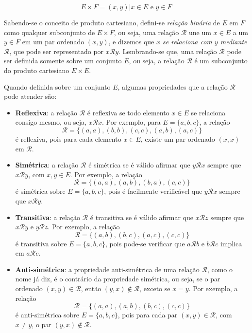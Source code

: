 \begin{equation}
  E \times F = {(x, y) | x \in E \mbox{ e } y \in F}
\end{equation}

Sabendo-se o conceito de produto cartesiano, defini-se \textit{relação binária} de \(E\) em \(F\) como qualquer subconjunto de \(E \times F\), ou seja, uma relação \(\mathcal{R}\) une um \(x \in E\) a um \(y \in F\) em um par ordenado \((x, y)\), e dizemos que \textit{\(x\) se relaciona com \(y\) mediante \(\mathcal{R}\)}, que pode ser representado por \(x\mathcal{R}y\)\cite{Domingues:2003}. Lembrando-se que, uma relação \(\mathcal{R}\) pode ser definida somente sobre um conjunto \(E\), ou seja, a relação \(\mathcal{R}\) é um subconjunto do produto cartesiano \(E \times E\).

Quando definida sobre um conjunto \(E\), algumas propriedades que a relação \(\mathcal{R}\) pode atender são:

\begin{itemize}
  \item \textbf{Reflexiva}: a relação \(\mathcal{R}\) é reflexiva se todo elemento \(x \in E\) se relaciona consigo mesmo, ou seja, \(x\mathcal{R}x\). Por exemplo, para \(E = \{a, b, c\}\), a relação 
  $$\mathcal{R} = \{(a, a), (b, b), (c, c), (a, b), (a, c)\}$$
  é reflexiva, pois para cada elemento \(x \in E\), existe um par ordenado \((x, x)\) em \(\mathcal{R}\)\cite{Domingues:2003}. 

  \item \textbf{Simétrica}: a relação \(\mathcal{R}\) é simétrica se é válido afirmar que \(y\mathcal{R}x\) sempre que \(x\mathcal{R}y\), com \(x, y \in E\). Por exemplo, a relação 
  $$\mathcal{R} = \{(a, a), (a, b), (b, a), (c, c)\}$$
  é simétrica sobre \(E = \{a, b, c\}\), pois é facilmente verificável que \(y\mathcal{R}x\) sempre que \(x\mathcal{R}y\)\cite{Domingues:2003}.

  \item \textbf{Transitiva}: a relação \(\mathcal{R}\) é transitiva se é válido afirmar que \(x\mathcal{R}z\) sempre que \(x\mathcal{R}y\) e \(y\mathcal{R}z\). Por exemplo, a relação 
  $$\mathcal{R} = \{(a, b), (b, c), (a, c), (c, c)\}$$
  é transitiva sobre \(E = \{a, b, c\}\), pois pode-se verificar que \(a\mathcal{R}b\) e \(b\mathcal{R}c\) implica em \(a\mathcal{R}c\)\cite{Domingues:2003}.

  \item \textbf{Anti-simétrica}: a propriedade anti-simétrica de uma relação \(\mathcal{R}\), como o nome já diz, é o contrário da propriedade simétrica, ou seja, se o par ordenado \((x, y) \in \mathcal{R}\), então \((y, x) \notin \mathcal{R}\), exceto se \(x = y\). Por exemplo, a relação 
  $$\mathcal{R} = \{(a, a), (a, b), (b, c), (c, c)\}$$
  é anti-simétrica sobre \(E = \{a, b, c\}\), pois para cada par \((x, y) \in \mathcal{R}\), com \(x \neq y\), o par \((y, x) \notin \mathcal{R}\).
\end{itemize}

